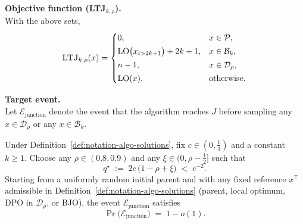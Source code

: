 \documentclass[lettersize,journal]{IEEEtran}
\begin{document}
\begin{definition}
	\medskip\noindent
	\textbf{Objective function (\textsc{LTJ}$_{k,\rho}$).}\\
	With the above sets,
	\[
	\textsc{LTJ}_{k,\rho}(x)
	=\begin{cases}
		0,                          & x\in\mathcal{P},\\[2pt]
		\mathrm{LO}\bigl(x_{i>2k+1}\bigr)+2k+1, & x\in\mathcal{B}_k,\\[2pt]
		n-1,                        & x\in\mathcal{D}_\rho,\\[2pt]
		\mathrm{LO}(x),             & \text{otherwise.}
	\end{cases}
	\]
	
	\medskip\noindent
	\textbf{Target event.}\\
	Let $\mathcal{E}_{\mathrm{junction}}$ denote the event that the algorithm reaches $J$ before
	sampling any $x\in\mathcal{D}_\rho$ or any $x\in\mathcal{B}_k$.
\end{definition}

\begin{lemma}
	\label{lem:junction-first-density-Bk}
	Under Definition~\ref{def:notation-algo-solutions}, fix $c\in(0,\tfrac13)$ and a constant $k\ge 1$.
	Choose any $\rho\in(0.8,0.9)$ and any $\xi\in(0,\rho-\tfrac12]$ such that
	\[
	q^\star \;:=\; 2c\,\bigl(1-\rho+\xi\bigr) \;<\; e^{-2}.
	\]
	Starting from a uniformly random initial parent and with any fixed reference $x^\top$ admissible in
	Definition~\ref{def:notation-algo-solutions} (parent, local optimum, DPO in $\mathcal{D}_\rho$, or BJO),
	the event $\mathcal{E}_{\mathrm{junction}}$ satisfies
	\[
	\Pr\bigl(\mathcal{E}_{\mathrm{junction}}\bigr)\;=\;1-o(1).
	\]
\end{lemma}
\end{document}

